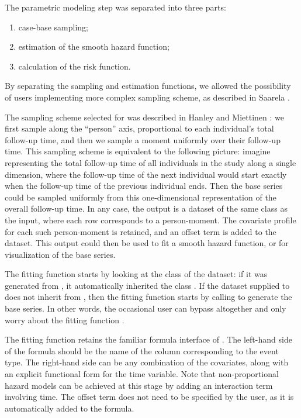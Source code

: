 \documentclass[
]{jss}
\providecommand{\tightlist}{%
  \setlength{\itemsep}{0pt}\setlength{\parskip}{0pt}}
\begin{document}
The parametric modeling step was separated into three parts:

\begin{enumerate}
\def\labelenumi{\arabic{enumi}.}
\tightlist
\item
  case-base sampling;
\item
  estimation of the smooth hazard function;
\item
  calculation of the risk function.
\end{enumerate}

By separating the sampling and estimation functions, we allowed the
possibility of users implementing more complex sampling scheme, as
described in Saarela \citeyearpar{saarela2016case}.

The sampling scheme selected for  was described in
Hanley and Miettinen \citeyearpar{hanley2009fitting}: we first sample
along the ``person'' axis, proportional to each individual's total
follow-up time, and then we sample a moment uniformly over their
follow-up time. This sampling scheme is equivalent to the following
picture: imagine representing the total follow-up time of all
individuals in the study along a single dimension, where the follow-up
time of the next individual would start exactly when the follow-up time
of the previous individual ends. Then the base series could be sampled
uniformly from this one-dimensional representation of the overall
follow-up time. In any case, the output is a dataset of the same class
as the input, where each row corresponds to a person-moment. The
covariate profile for each such person-moment is retained, and an offset
term is added to the dataset. This output could then be used to fit a
smooth hazard function, or for visualization of the base series.

The fitting function  starts by looking at the
class of the dataset: if it was generated from , it
automatically inherited the class . If the dataset supplied
to  does not inherit from , then the
fitting function starts by calling  to generate the
base series. In other words, the occasional user can bypass
 altogether and only worry about the fitting
function .

The fitting function retains the familiar formula interface of
. The left-hand side of the formula should be the name of the
column corresponding to the event type. The right-hand side can be any
combination of the covariates, along with an explicit functional form
for the time variable. Note that non-proportional hazard models can be
achieved at this stage by adding an interaction term involving time. The
offset term does not need to be specified by the user, as it is
automatically added to the formula.
\end{document}

